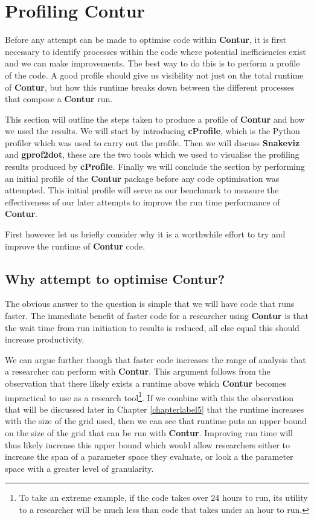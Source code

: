 \chapter{Profiling Contur}
\label{chapterlabel3}

Before any attempt can be made to optimise code within \textbf{Contur}, it is first necessary to identify processes within the code where potential inefficiencies exist and we can make improvements. The best way to do this is to perform a profile of the code. A good profile should give us visibility not just on the total runtime of \textbf{Contur}, but how this runtime breaks down between the different processes that compose a \textbf{Contur} run. 

This section will outline the steps taken to produce a profile of \textbf{Contur} and how we used the results. We will start by introducing \textbf{cProfile}, which is the Python profiler which was used to carry out the profile. Then we will discuss \textbf{Snakeviz} and \textbf{gprof2dot}, these are the two tools which we used to visualise the profiling results produced by \textbf{cProfile}. Finally we will conclude the section by performing an initial profile of the \textbf{Contur} package before any code optimisation was attempted. This initial profile will serve as our benchmark to measure the effectiveness of our later attempts to improve the run time performance of \textbf{Contur}.

First however let us briefly consider why it is a worthwhile effort to try and improve the runtime of \textbf{Contur} code.

\section{Why attempt to optimise Contur?}
The obvious answer to the question  is simple that we will have code that runs faster. The immediate benefit of faster code for a researcher using \textbf{Contur} is that the wait time from run initiation to results is reduced, all else equal this should increase productivity.

We can argue further though that faster code increases the range of analysis that a researcher can perform with \textbf{Contur}. This argument follows from the observation that there likely exists a runtime above which \textbf{Contur} becomes impractical to use as a research tool\footnote{To take an extreme example, if the code takes over 24 hours to run, its utility to a researcher will be much less than code that takes under an hour to run.}. If we combine with this the observation that will be discussed later in Chapter \ref{chapterlabel5} that the runtime increases with the size of the grid used, then we can see that runtime puts an upper bound on the size of the grid that can be run with \textbf{Contur}. Improving run time will thus likely increase this upper bound which would allow researchers either to increase the span of a parameter space they evaluate, or look a the parameter space with a greater level of granularity.

